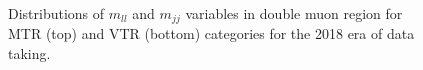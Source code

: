 \begin{figure}[htbp]
{    }
  \caption{Distributions of $m_{ll}$ and $m_{jj}$ variables in double muon region for MTR (top) and VTR (bottom) categories for the 2018 era of data taking.}
  \label{fig:2018_Zmumu_1}
\end{figure}


